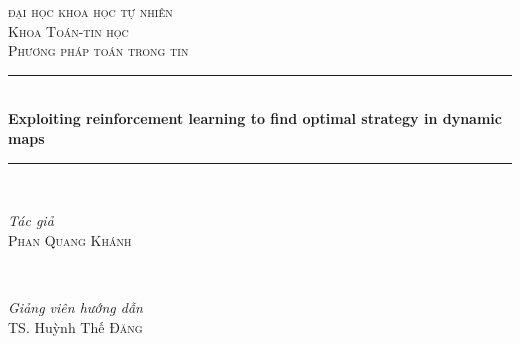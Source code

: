 \documentclass[12pt,a4paper]{article}
\begin{document}

\begin{titlepage} %
	\newcommand{\HRule}{\rule{\linewidth}{0.5mm}} %
	
	\center %
	
	
	\textsc{\LARGE đại học khoa học tự nhiên}\\[1.5cm] 
	\textsc{\Large Khoa Toán-tin học}\\[0.5cm] 
	
	\textsc{\large Phương pháp toán trong tin}\\[0.5cm] 
	
	
	\HRule\\[0.4cm]
	
	{\huge\bfseries Exploiting reinforcement learning to find optimal strategy in dynamic maps}\\[0.4cm] %
	
	\HRule\\[1.5cm]
	
	
	\begin{minipage}{0.4\textwidth}
		\begin{flushleft}
			\large
			\textit{Tác giả}\\
			\textsc{Phan Quang Khánh} %
		\end{flushleft}
	\end{minipage}
	~
	\begin{minipage}{0.4\textwidth}
		\begin{flushright}
			\large
			\textit{Giảng viên hướng dẫn}\\
			TS. Huỳnh Thế \textsc{Đăng} %
		\end{flushright}
	\end{minipage}
	

\end{titlepage}
\end{document}
